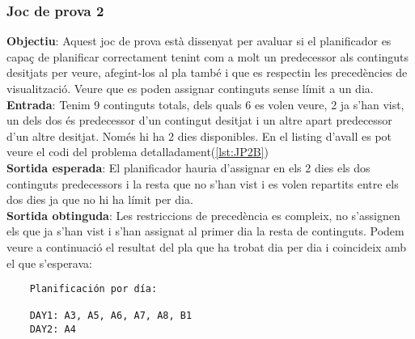 \documentclass[a4paper]{article}
\begin{document}
	\subsubsection{Joc de prova 2}
	\textbf{Objectiu}: Aquest joc de prova està dissenyat per avaluar si el planificador es capaç de planificar correctament tenint com a molt un predecessor als continguts desitjats per veure, afegint-los al pla també i que es respectin les precedències de visualització. Veure que es poden assignar continguts sense límit a un dia. \\
	\textbf{Entrada}: Tenim 9 continguts totals, dels quals 6 es volen veure, 2 ja s'han vist, un dels dos és predecessor d'un contingut desitjat i un altre apart predecessor d'un altre desitjat. Només hi ha 2 dies disponibles. En el listing d'avall es pot veure el codi del problema detalladament(\ref{lst:JP2B})\\
	\textbf{Sortida esperada}: El planificador hauria d'assignar en els 2 dies els dos continguts predecessors i la resta que no s'han vist i es volen repartits entre els dos dies ja que no hi ha límit per dia. \\
	\textbf{Sortida obtinguda}: Les restriccions de 
	precedència es compleix, no s'assignen els que ja s'han vist i s'han assignat al primer dia la resta de continguts. Podem veure a continuació el resultat del pla que ha trobat dia per dia i coincideix amb el que s'esperava:
	
	\begin{verbatim}
	Planificación por día:
	
	DAY1: A3, A5, A6, A7, A8, B1
	DAY2: A4
		
	\end{verbatim}
	
\end{document}
